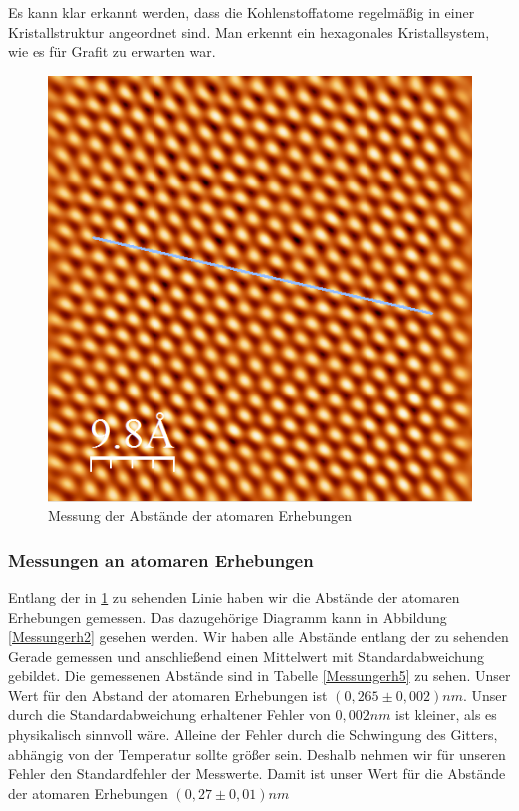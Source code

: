 \documentclass[10pt,a4paper]{article}
\begin{document}
Es kann klar erkannt werden, dass die Kohlenstoffatome regelmäßig in einer Kristallstruktur angeordnet sind. Man erkennt ein hexagonales Kristallsystem, wie es für Grafit zu erwarten war.

\begin{figure}[h]
	\centering
	
	\includegraphics[scale = 0.6]{Aufnahme_Ebene_doppelte_fourier2.png}
	
	\caption{Messung der Abstände der atomaren Erhebungen}
	\label{Messungerh1}
\end{figure}

\subsubsection{Messungen an atomaren Erhebungen}

Entlang der in \ref{Messungerh1} zu sehenden Linie haben wir die Abstände der atomaren Erhebungen gemessen. Das dazugehörige Diagramm kann in Abbildung \ref{Messungerh2} gesehen werden. Wir haben alle Abstände entlang der zu sehenden Gerade gemessen und anschließend einen Mittelwert mit Standardabweichung gebildet. Die gemessenen Abstände sind in Tabelle \ref{Messungerh5} zu sehen. Unser Wert für den Abstand der atomaren Erhebungen ist $(0,265 \pm 0,002) nm$. Unser durch die Standardabweichung erhaltener Fehler von $0,002 nm$ ist kleiner, als es physikalisch sinnvoll wäre. Alleine der Fehler durch die Schwingung des Gitters, abhängig von der Temperatur sollte größer sein. Deshalb nehmen wir für unseren Fehler den Standardfehler der Messwerte. Damit ist unser Wert für die Abstände der atomaren Erhebungen $(0,27 \pm 0,01) nm$
\end{document}
